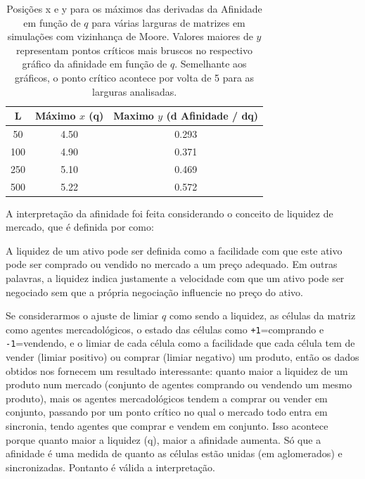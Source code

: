 \documentclass[
	12pt,				%
	openright,			%
	twoside,			%
	a4paper,			%
	english,			%
	french,				%
	spanish,			%
	brazil				%
	]{abntex2}
\begin{document}
\begin{table}
  \centering
  \caption{Posições x e y para os máximos das derivadas da Afinidade em função de $q$ para várias larguras de matrizes em simulações com vizinhança de Moore. Valores maiores de $y$ representam pontos críticos mais bruscos no respectivo gráfico da afinidade em função de $q$. Semelhante aos gráficos, o ponto crítico acontece por volta de 5 para as larguras analisadas.}
  \label{tab:maximosAfinidadeMoore}
  \begin{tabular}{ccc}\toprule
    L	& Máximo $x$ (q)	& Maximo $y$ (d Afinidade / dq)\\\midrule\midrule
    50	& 4.50	& 0.293\\
    100	& 4.90	& 0.371\\
    250	& 5.10	& 0.469\\
    500	& 5.22	& 0.572\\\bottomrule
  \end{tabular}
\end{table}

A interpretação da afinidade foi feita considerando o conceito de liquidez de mercado, que é definida por  como:
\begin{citacao}
  A liquidez de um ativo pode ser definida como a facilidade com que este ativo pode ser
comprado ou vendido no mercado a um preço adequado. Em outras palavras, a liquidez indica
justamente a velocidade com que um ativo pode ser negociado sem que a própria negociação
influencie no preço do ativo. \cite{anbima4}
\end{citacao}

Se considerarmos o ajuste de limiar $q$ como sendo a liquidez, as células da matriz como agentes mercadológicos, o estado das células como \texttt{+1}=comprando e \texttt{-1}=vendendo, e o limiar de cada célula como a facilidade que cada célula tem de vender (limiar positivo) ou comprar (limiar negativo) um produto, então os dados obtidos nos fornecem um resultado interessante: quanto maior a liquidez de um produto num mercado (conjunto de agentes comprando ou vendendo um mesmo produto), mais os agentes mercadológicos tendem a comprar ou vender em conjunto, passando por um ponto crítico no qual o mercado todo entra em sincronia, tendo agentes que comprar e vendem em conjunto. Isso acontece porque quanto maior a liquidez (q), maior a afinidade aumenta. Só que a afinidade é uma medida de quanto as células estão unidas (em aglomerados) e sincronizadas. Pontanto é válida a interpretação.
\end{document}
